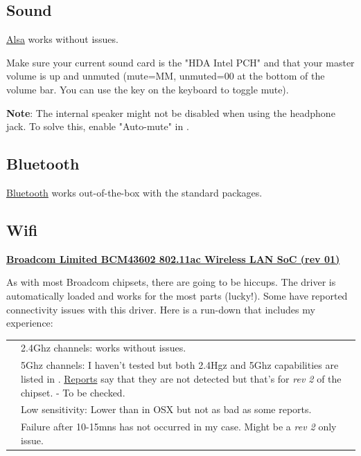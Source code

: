 \subsection{Sound}

\href{https://wiki.archlinux.org/index.php/ALSA}{Alsa} works without issues.

\begin{blocksection}
	Make sure your current sound card is the "HDA Intel PCH" and that your master volume is up and unmuted (mute=MM, unmuted=00 at the bottom of the volume bar. You can use the  key on the keyboard to toggle mute).
\end{blocksection}

\vspace*{1em}
\textbf{Note}: The internal speaker might not be disabled when using the headphone jack. To solve this, enable "Auto-mute" in .

\subsection{Bluetooth}

\href{https://wiki.archlinux.org/index.php/Bluetooth}{Bluetooth} works out-of-the-box with the standard packages.


\subsection{Wifi}

\textbf{\textcolor{textgrey}{\uline{Broadcom Limited BCM43602 802.11ac Wireless LAN SoC (rev 01)}}}

As with most Broadcom chipsets, there are going to be hiccups. The  driver is automatically loaded and works for the most parts (lucky!). Some have reported connectivity issues with this driver. Here is a run-down that includes my experience:

\vspace*{1em}
\begin{tabularx}{\textwidth}{cX}
	\raisebox{-0.2\height}{\color{green}{\openiconic[]}} & 2.4Ghz channels: works without issues.\\
	\raisebox{-0.2\height}{\color{orange}{\openiconic[]}} & 5Ghz channels: I haven't tested but both 2.4Hgz and 5Ghz capabilities are listed in \code{iw list}. \href{https://bugzilla.kernel.org/show_bug.cgi?id=193121}{Reports} say that they are not detected but that's for \textit{rev 2} of the chipset. - To be checked.\\
	\raisebox{-0.2\height}{\color{orange}{\openiconic[]}} & Low sensitivity: Lower than in OSX but not as bad as some reports.\\
	\raisebox{-0.2\height}{\color{green}{\openiconic[]}} & Failure after 10-15mns has not occurred in my case. Might be a \textit{rev 2} only issue.
\end{tabularx}


